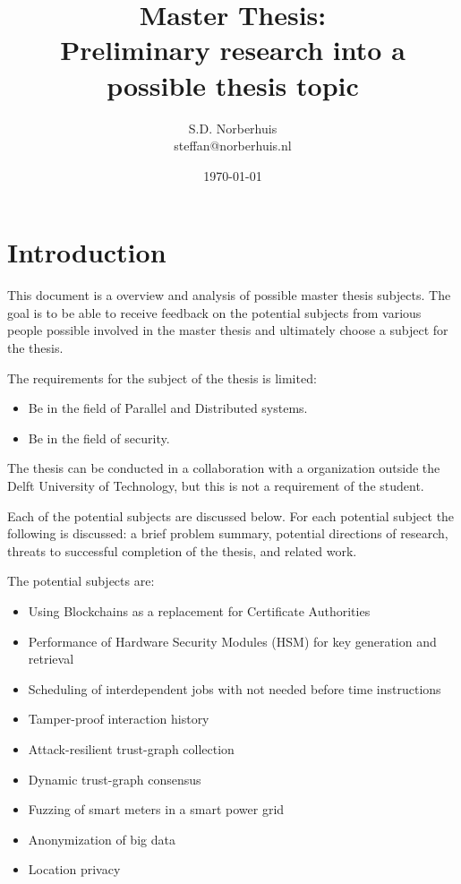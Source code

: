 \documentclass{article}
\title{Master Thesis:\\ Preliminary research into a possible thesis topic}
\author{S.D. Norberhuis\\steffan@norberhuis.nl}
\date{\today}
\begin{document}
\maketitle

\tableofcontents

\section{Introduction}
This document is a overview and analysis of possible master thesis subjects.
The goal is to be able to receive feedback on the potential subjects from various people possible involved in the master thesis
and ultimately choose a subject for the thesis.

The requirements for the subject of the thesis is limited:
\begin{itemize}
\item Be in the field of Parallel and Distributed systems.
\item Be in the field of security.
\end{itemize}
The thesis can be conducted in a collaboration with a organization outside the Delft University of Technology,
but this is not a requirement of the student. 

Each of the potential subjects are discussed below.
For each potential subject the following is discussed: 
a brief problem summary, potential directions of research, threats to successful completion of the thesis, and related work.

The potential subjects are:
\begin{itemize}
	\item Using Blockchains as a replacement for Certificate Authorities
	\item Performance of Hardware Security Modules (HSM) for key generation and retrieval
	\item Scheduling of interdependent jobs with not needed before time instructions
	\item Tamper-proof interaction history
	\item Attack-resilient trust-graph collection
	\item Dynamic trust-graph consensus
	\item Fuzzing of smart meters in a smart power grid
	\item Anonymization of big data
	\item Location privacy
\end{itemize}





\end{document}
